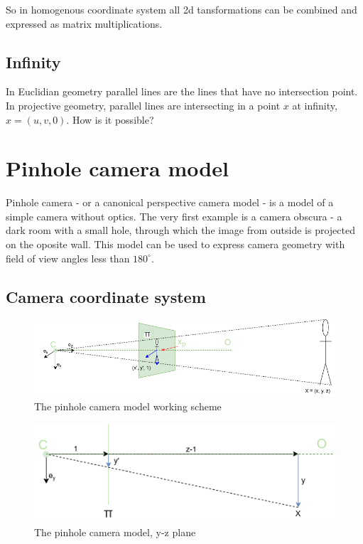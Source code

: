 So in homogenous coordinate system all 2d tansformations can be combined and expressed as matrix multiplications.

\subsection{Infinity}
In Euclidian geometry parallel lines are the lines that have no intersection point. In projective geometry, parallel lines are intersecting in a point $x$ at infinity, $x = (u, v, 0)$. How is it possible?

\section{Pinhole camera model}
Pinhole camera - or a canonical perspective camera model - is a model of a simple camera without optics.
The very first example is a camera obscura - a dark room with a small hole, through which the image from outside is projected on the oposite wall. 
This model can be used to express camera geometry with field of view angles less than $180^{\circ}$.

\subsection{Camera coordinate system}
\begin{figure}[h]
    \centering
    \includegraphics[width=1\textwidth]{graphics/td_scene.png}
    \caption{The pinhole camera model working scheme}
    \label{fig:td_scene_3d}
\end{figure}

\begin{figure}[h]
    \centering
    \includegraphics[width=1\textwidth]{graphics/td_scene_yz.png}
    \caption{The pinhole camera model, y-z plane}
    \label{fig:td_scene_yz}
\end{figure}

